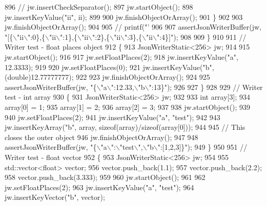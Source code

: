 \begin{DoxyCode}
{{{{{{{{896             \textcolor{comment}{// jw.insertCheckSeparator();}
897             jw.startObject();
898             jw.insertKeyValue(\textcolor{stringliteral}{"ii"}, ii);
899 
900             jw.finishObjectOrArray();
901         \}
902 
903         jw.finishObjectOrArray();
904 
905         \textcolor{comment}{// printf("'%
906 
907         assertJsonWriterBuffer(jw, \textcolor{stringliteral}{"[\{\(\backslash\)"ii\(\backslash\)":0\},\{\(\backslash\)"ii\(\backslash\)":1\},\{\(\backslash\)"ii\(\backslash\)":2\},\{\(\backslash\)"ii\(\backslash\)":3\},\{\(\backslash\)"ii\(\backslash\)":4\}]"});
908 
909     \}
910 
911     \textcolor{comment}{// Writer test - float places object}
912     \{
913         JsonWriterStatic<256> jw;
914 
915         jw.startObject();
916 
917         jw.setFloatPlaces(2);
918         jw.insertKeyValue(\textcolor{stringliteral}{"a"}, 12.3333);
919 
920         jw.setFloatPlaces(0);
921         jw.insertKeyValue(\textcolor{stringliteral}{"b"}, (\textcolor{keywordtype}{double})12.77777777);
922 
923         jw.finishObjectOrArray();
924 
925         assertJsonWriterBuffer(jw, \textcolor{stringliteral}{"\{\(\backslash\)"a\(\backslash\)":12.33,\(\backslash\)"b\(\backslash\)":13\}"});
926 
927     \}
928 
929     \textcolor{comment}{// Writer test - int array}
930     \{
931         JsonWriterStatic<256> jw;
932 
933         \textcolor{keywordtype}{int} array[3];
934         array[0] = 1;
935         array[1] = 2;
936         array[2] = 3;
937 
938         jw.startObject();
939 
940         jw.setFloatPlaces(2);
941         jw.insertKeyValue(\textcolor{stringliteral}{"a"}, \textcolor{stringliteral}{"test"});
942 
943         jw.insertKeyArray(\textcolor{stringliteral}{"b"}, array, \textcolor{keyword}{sizeof}(array)/\textcolor{keyword}{sizeof}(array[0]));
944         
945         \textcolor{comment}{// This closes the outer object}
946         jw.finishObjectOrArray();
947 
948         assertJsonWriterBuffer(jw, \textcolor{stringliteral}{"\{\(\backslash\)"a\(\backslash\)":\(\backslash\)"test\(\backslash\)",\(\backslash\)"b\(\backslash\)":[1,2,3]\}"});
949     \}
950 
951     \textcolor{comment}{// Writer test - float vector}
952     \{
953         JsonWriterStatic<256> jw;
954 
955         std::vector<float> vector;
956         vector.push\_back(1.1);
957         vector.push\_back(2.2);
958         vector.push\_back(3.333);
959 
960         jw.startObject();
961 
962         jw.setFloatPlaces(2);
963         jw.insertKeyValue(\textcolor{stringliteral}{"a"}, \textcolor{stringliteral}{"test"});
964         jw.insertKeyVector(\textcolor{stringliteral}{"b"}, vector);
}}}}}}}}}
\end{DoxyCode}
